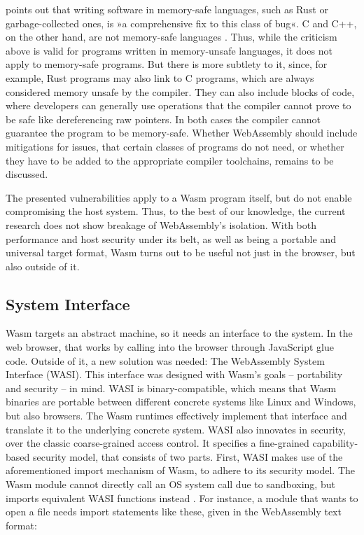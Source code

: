 \citeauthor{Wingo2020} points out that writing software in memory-safe languages, such as Rust or garbage-collected ones, is »a comprehensive fix to this class of bug«. C and C++, on the other hand, are not memory-safe languages \cite{Wingo2020}. Thus, while the criticism above is valid for programs written in memory-unsafe languages, it does not apply to memory-safe programs. But there is more subtlety to it, since, for example, Rust programs may also link to C programs, which are always considered memory unsafe by the compiler. They can also include blocks of  code, where developers can generally use operations that the compiler cannot prove to be safe like dereferencing raw pointers. In both cases the compiler cannot guarantee the program to be memory-safe. Whether WebAssembly should include mitigations for issues, that certain classes of programs do not need, or whether they have to be added to the appropriate compiler toolchains, remains to be discussed.

The presented vulnerabilities apply to a Wasm program itself, but do not enable compromising the host system. Thus, to the best of our knowledge, the current research does not show breakage of WebAssembly's isolation. With both performance and host security under its belt, as well as being a portable and universal target format, Wasm turns out to be useful not just in the browser, but also outside of it.


\subsection{System Interface}

Wasm targets an abstract machine, so it needs an interface to the system. In the web browser, that works by calling into the browser through JavaScript glue code. Outside of it, a new solution was needed: The WebAssembly System Interface (WASI). This interface was designed with Wasm's goals -- portability and security -- in mind.
WASI is binary-compatible, which means that Wasm binaries are portable between different concrete systems like Linux and Windows, but also browsers. The Wasm runtimes effectively implement that interface and translate it to the underlying concrete system.
WASI also innovates in security, over the classic coarse-grained access control. It specifies a fine-grained capability-based security model, that consists of two parts. First, WASI makes use of the aforementioned import mechanism of Wasm, to adhere to its security model. The Wasm module cannot directly call an OS system call due to sandboxing, but imports equivalent WASI functions instead \cite{Clark2019}. For instance, a module that wants to open a file needs import statements like these, given in the WebAssembly text format:

